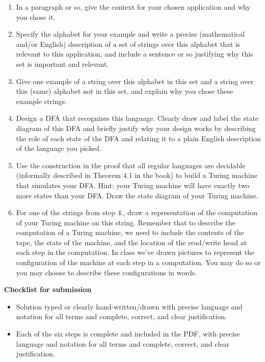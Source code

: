 \begin{enumerate}
   \item In a paragraph or so, give the context for your chosen application and why you chose it.
   \item Specify the alphabet for your example and write a precise (mathematical and/or English) description of a set of strings over 
   this alphabet that is relevant to this application, and include a sentence or so justifying why this set is 
   important and relevant.
   \item Give one example of a string over this alphabet in this set and a string 
   over this (same) alphabet not in this set, and explain why you 
   chose these example strings.
   \item Design a DFA that recognizes this language. Clearly draw and label the state diagram 
   of this DFA and briefly justify why your design works by describing the role of each state of the DFA and 
   relating it to a plain English description of the language you picked.
   \item Use the construction in the proof that all regular languages are decidable
   (informally described in Theorem 4.1 in the book) to build a Turing machine
   that simulates your DFA. Hint: your Turing machine will have exactly two more states than your DFA.
   Draw the state diagram of your Turing machine.
   \item For one of the strings from step 4., draw a representation of the computation of your 
   Turing machine on this string.
   Remember that to describe the computation of a Turing machine, we need to include the contents of the 
   tape, the state of the machine, and the location of the read/write head at each step in the computation.
   In class we've drawn pictures to represent the configuration of the machine at each step 
   in a computation.  You may do so or you may choose to describe these configurations in words.
\end{enumerate}
{\bf Checklist for submission}
\begin{itemize}
   \item Solution typed or clearly hand-written/drawn with precise language and notation for all terms and complete, correct, and clear justification.
   \item Each of the six steps is complete and included in the PDF, with precise language and notation for all
    terms and complete, correct, and clear justification.

\end{itemize}


